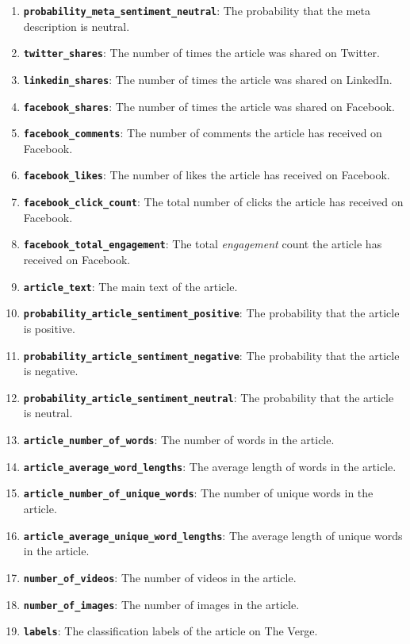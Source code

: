 \documentclass{article}
\begin{document}
\begin{enumerate}
\item \texttt{\textbf{probability\_meta\_sentiment\_neutral}}: The probability that the meta description is neutral.
\item \texttt{\textbf{twitter\_shares}}: The number of times the article was shared on Twitter.
\item \texttt{\textbf{linkedin\_shares}}: The number of times the article was shared on LinkedIn.
\item \texttt{\textbf{facebook\_shares}}: The number of times the article was shared on Facebook.
\item \texttt{\textbf{facebook\_comments}}: The number of comments the article has received on Facebook.
\item \texttt{\textbf{facebook\_likes}}: The number of likes the article has received on Facebook.
\item \texttt{\textbf{facebook\_click\_count}}: The total number of clicks the article has received on Facebook.
\item \texttt{\textbf{facebook\_total\_engagement}}: The total \emph{engagement} count the article has received on Facebook.
\item \texttt{\textbf{article\_text}}: The main text of the article.
\item \texttt{\textbf{probability\_article\_sentiment\_positive}}: The probability that the article is positive.
\item \texttt{\textbf{probability\_article\_sentiment\_negative}}: The probability that the article is negative.
\item \texttt{\textbf{probability\_article\_sentiment\_neutral}}: The probability that the article is neutral.
\item \texttt{\textbf{article\_number\_of\_words}}: The number of words in the article.
\item \texttt{\textbf{article\_average\_word\_lengths}}: The average length of words in the article.
\item \texttt{\textbf{article\_number\_of\_unique\_words}}: The number of unique words in the article.
\item \texttt{\textbf{article\_average\_unique\_word\_lengths}}: The average length of unique words in the article.
\item \texttt{\textbf{number\_of\_videos}}: The number of videos in the article.
\item \texttt{\textbf{number\_of\_images}}: The number of images in the article.
\item \texttt{\textbf{labels}}: The classification labels of the article on The Verge.
\end{enumerate}
\end{document}
